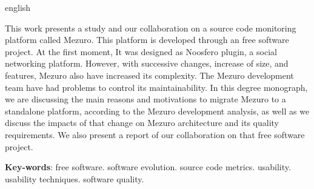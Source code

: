 \begin{resumo}[Abstract]
  \begin{otherlanguage*}{english} 
  
This work presents a study and our collaboration on a source code monitoring platform called Mezuro. This platform is developed through an free software project. At the first moment, It was designed as Noosfero plugin, a social networking platform.
%
However, with successive changes, increase of size, and features, Mezuro also have increased its complexity. The Mezuro development team have had problems to control its maintainability.
%
In this degree monograph, we are discussing the main reasons and motivations to migrate Mezuro to a standalone platform, according to the Mezuro development analysis, as well as we discuss the impacts of that change on Mezuro architecture and its quality requirements.
%
We also present a report of our collaboration on that free software project.
  
  \vspace{\onelineskip}
 
  \noindent 
  \textbf{Key-words}: free software. software evolution. source code metrics. usability. usability techniques. software quality.
  \end{otherlanguage*}
\end{resumo}


